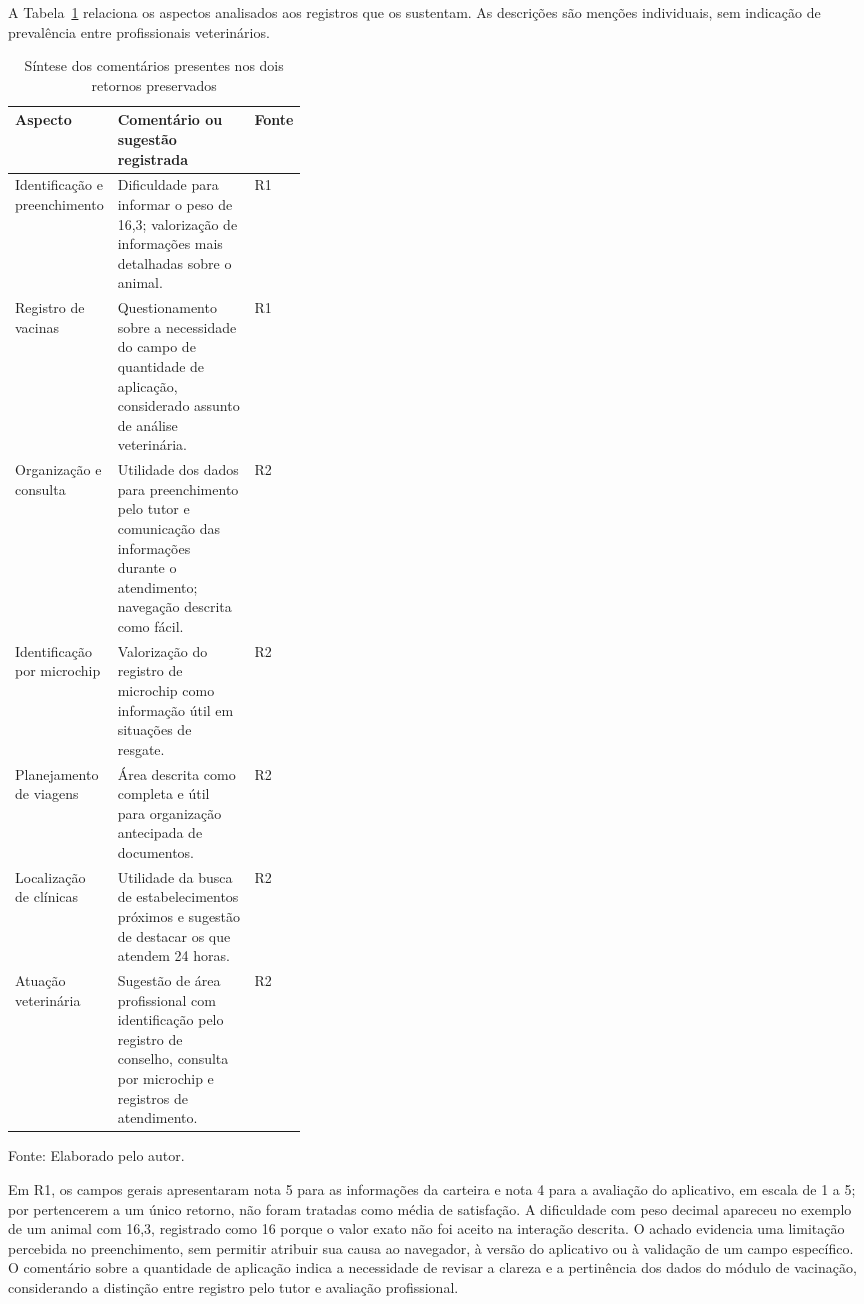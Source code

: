 \documentclass{UNESC}
\begin{document}
A Tabela~\ref{tab:resumo_qualitativo} relaciona os aspectos analisados aos registros que os sustentam. As descrições são menções individuais, sem indicação de prevalência entre profissionais veterinários.

\begin{table}[htbp]
\centering
\caption{Síntese dos comentários presentes nos dois retornos preservados}
\label{tab:resumo_qualitativo}
\small
\setlength{\tabcolsep}{4pt}
\renewcommand{\arraystretch}{1.1}
\begin{tabular}{@{}p{0.24\linewidth} p{} p{0.10\linewidth}@{}}
\hline
\textbf{Aspecto} & \textbf{Comentário ou sugestão registrada} & \textbf{Fonte} \\
\hline
Identificação e preenchimento & Dificuldade para informar o peso de 16,3; valorização de informações mais detalhadas sobre o animal. & R1 \\
Registro de vacinas & Questionamento sobre a necessidade do campo de quantidade de aplicação, considerado assunto de análise veterinária. & R1 \\
Organização e consulta & Utilidade dos dados para preenchimento pelo tutor e comunicação das informações durante o atendimento; navegação descrita como fácil. & R2 \\
Identificação por microchip & Valorização do registro de microchip como informação útil em situações de resgate. & R2 \\
Planejamento de viagens & Área descrita como completa e útil para organização antecipada de documentos. & R2 \\
Localização de clínicas & Utilidade da busca de estabelecimentos próximos e sugestão de destacar os que atendem 24 horas. & R2 \\
Atuação veterinária & Sugestão de área profissional com identificação pelo registro de conselho, consulta por microchip e registros de atendimento. & R2 \\
\hline
\end{tabular}
\par\vspace{2pt}
{\footnotesize\raggedright Fonte: Elaborado pelo autor.\par}
\end{table}

Em R1, os campos gerais apresentaram nota 5 para as informações da carteira e nota 4 para a avaliação do aplicativo, em escala de 1 a 5; por pertencerem a um único retorno, não foram tratadas como média de satisfação. A dificuldade com peso decimal apareceu no exemplo de um animal com 16,3, registrado como 16 porque o valor exato não foi aceito na interação descrita. O achado evidencia uma limitação percebida no preenchimento, sem permitir atribuir sua causa ao navegador, à versão do aplicativo ou à validação de um campo específico. O comentário sobre a quantidade de aplicação indica a necessidade de revisar a clareza e a pertinência dos dados do módulo de vacinação, considerando a distinção entre registro pelo tutor e avaliação profissional.
\end{document}
